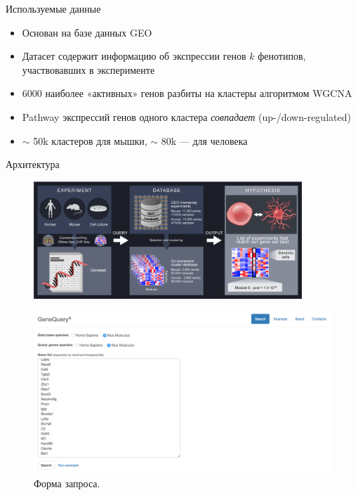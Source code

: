 \documentclass[10pt,pdf,utf8,russian,aspectratio=169]{beamer}
\begin{document}
\begin{frame}{Используемые данные}
  \begin{itemize}[<+->]
    \item Основан на базе данных GEO
    \item Датасет содержит информацию об экспрессии генов $k$ фенотипов, участвовавших в эксперименте
    \item 6000 наиболее «активных» генов разбиты на кластеры алгоритмом WGCNA
    \item Pathway экспрессий генов одного кластера \emph{совпадает} (up-/down-regulated)  
    \item $\sim$ 50k кластеров для мышки, $\sim$ 80k --- для человека
  \end{itemize}
\end{frame}

\begin{frame}{Архитектура}
    \begin{figure}[p]
        \centering
        \includegraphics[width=0.9\textwidth]{./img/architecture.png}
    \end{figure}      
\end{frame}

\begin{frame}
    \begin{figure}[p]
        \centering
        \caption{Форма запроса.}
        \includegraphics[height=0.9\textheight]{./img/screen_query.png}
    \end{figure}
\end{frame}
\end{document}
